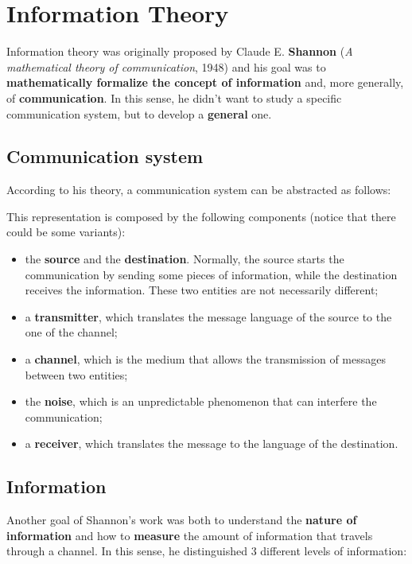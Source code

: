 \section {Information Theory}

Information theory was originally proposed by Claude E. \textbf{Shannon} (\textit{A mathematical theory of communication}, 1948) and his goal was to \textbf{mathematically formalize the concept of information} and, more generally, of \textbf{communication}. In this sense, he didn't want to study a specific communication system, but to develop a \textbf{general} one. 

\subsection{Communication system}
According to his theory, a communication system can be abstracted as follows:


This representation is composed by the following components (notice that there could be some variants):

\begin{itemize}
    \item the \textbf{source} and the \textbf{destination}. Normally, the source starts the communication by sending some pieces of information, while the destination receives the information. These two entities are not necessarily different;
    \item a \textbf{transmitter}, which translates the message language of the source to the one of the channel;    
    \item a \textbf{channel}, which is the medium that allows the transmission of messages between two entities;
    \item the \textbf{noise}, which is an unpredictable phenomenon that can interfere the communication;
    \item a \textbf{receiver}, which translates the message to the language of the destination.
\end{itemize}

\subsection{Information}
Another goal of Shannon's work was both to understand the \textbf{nature of information} and how to \textbf{measure} the amount of information that travels through a channel. In this sense, he distinguished 3 different levels of information:

